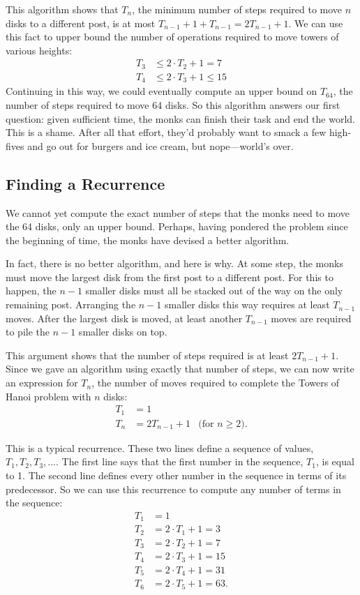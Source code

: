 This algorithm shows that $T_n$, the minimum number of steps required
to move $n$ disks to a different post, is at most $T_{n-1} + 1 +
T_{n-1} = 2 T_{n-1} + 1$.  We can use this fact to upper bound the
number of operations required to move towers of various heights:
\begin{align*}
T_3 & \leq 2 \cdot T_2 + 1 = 7 \\
T_4 & \leq 2 \cdot T_3 + 1 \leq 15
\end{align*}
Continuing in this way, we could eventually compute an upper bound on
$T_{64}$, the number of steps required to move 64 disks.  So this
algorithm answers our first question: given sufficient time, the monks
can finish their task and end the world.  This is a shame.  After all
that effort, they'd probably want to smack a few high-fives and go out
for burgers and ice cream, but nope---world's over.

\subsection{Finding a Recurrence}

We cannot yet compute the exact number of steps that the monks need
to move the 64 disks, only an upper bound.  Perhaps, having pondered
the problem since the beginning of time, the monks have devised a
better algorithm.

In fact, there is no better algorithm, and here is why.  At some step,
the monks must move the largest disk from the first post to a
different post.  For this to happen, the $n - 1$ smaller disks must all
be stacked out of the way on the only remaining post.  Arranging the $n
- 1$ smaller disks this way requires at least $T_{n-1}$ moves.  After
the largest disk is moved, at least another $T_{n-1}$ moves are
required to pile the $n - 1$ smaller disks on top.

This argument shows that the number of steps required is at least
$2T_{n-1} + 1$.  Since we gave an algorithm using exactly that number
of steps, we can now write an expression for $T_n$, the number of
moves required to complete the Towers of Hanoi problem with $n$ disks:
\begin{align*}
T_1 & = 1 \\
T_n & = 2T_{n-1} + 1 & \text{(for $n \geq 2$)}.
\end{align*}

This is a typical recurrence.  These two lines define a sequence of
values, $T_1, T_2, T_3, \dots$.  The first line says that the first
number in the sequence, $T_1$, is equal to 1.  The second line defines
every other number in the sequence in terms of its predecessor.  So we
can use this recurrence to compute any number of terms in the sequence:
\begin{align*}
T_1 & = 1 \\
T_2 & = 2 \cdot T_1 + 1 = 3 \\
T_3 & = 2 \cdot T_2 + 1 = 7 \\
T_4 & = 2 \cdot T_3 + 1 = 15 \\
T_5 & = 2 \cdot T_4 + 1 = 31 \\
T_6 & = 2 \cdot T_5 + 1 = 63.
\end{align*}

